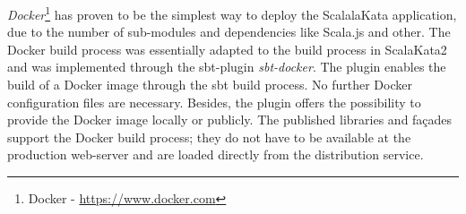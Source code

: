 \textit{Docker}\footnote{Docker - \url{https://www.docker.com}} has proven to be the simplest way to deploy the ScalalaKata application, due to the number of sub-modules and dependencies like Scala.js and other. The Docker build process was essentially adapted to the build process in ScalaKata2 and was implemented through the sbt-plugin \textit{sbt-docker}. The plugin enables the build of a Docker image through the sbt build process. No further Docker configuration files are necessary. Besides, the plugin offers the possibility to provide the Docker image locally or publicly. The published libraries and façades support the Docker build process; they do not have to be available at the production web-server and are loaded directly from the distribution service.

























